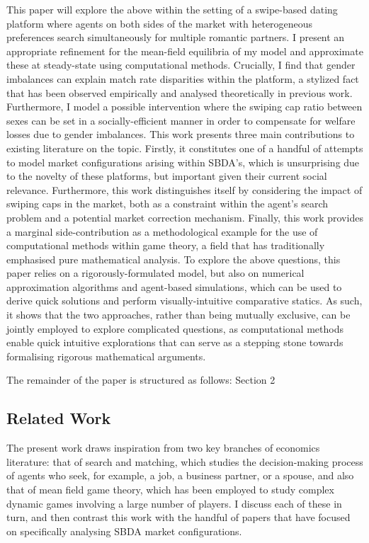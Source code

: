 This paper will explore the above within the setting of a swipe-based dating platform where agents on both sides of the market with heterogeneous preferences search simultaneously for multiple romantic partners. I present an appropriate refinement for the mean-field equilibria of my model and approximate these at steady-state using computational methods. 
Crucially, I find that gender imbalances can explain match rate disparities within the platform, a stylized fact that has been observed empirically and analysed theoretically in previous work. Furthermore, I model a possible intervention where the swiping cap ratio between sexes can be set in a socially-efficient manner in order to compensate for welfare losses due to gender imbalances.
This work presents three main contributions to existing literature on the topic. 
Firstly, it constitutes one of a handful of attempts to model market configurations arising within SBDA's, which is unsurprising due to the novelty of these platforms, but important given their current social relevance. 
Furthermore, this work distinguishes itself by considering the impact of swiping caps in the market, both as a constraint within the agent's search problem and a potential market correction mechanism.
Finally, this work provides a marginal side-contribution as a methodological example for the use of computational methods within game theory, a field that has traditionally emphasised pure mathematical analysis. To explore the above questions, this paper relies on a rigorously-formulated model, but also on numerical approximation algorithms and agent-based simulations, which can be used to derive quick solutions and perform visually-intuitive comparative statics. 
As such, it shows that the two approaches, rather than being mutually exclusive, can be jointly employed to explore complicated questions, as computational methods enable quick intuitive explorations that can serve as a stepping stone towards formalising rigorous mathematical arguments.

The remainder of the paper is structured as follows: Section 2

\subsection{Related Work}
The present work draws inspiration from two key branches of economics literature: that of search and matching, which studies the decision-making process of agents who seek, for example, a job, a business partner, or a spouse, and also that of mean field game theory, which has been employed to study complex dynamic games involving a large number of players. I discuss each of these in turn, and then contrast this work with the handful of papers that have focused on specifically analysing SBDA market configurations.

